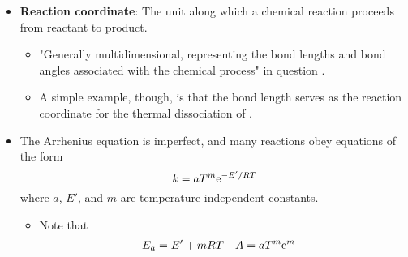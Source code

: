 \documentclass[../notes.tex]{subfiles}
\begin{document}
\begin{itemize}
    \item \textbf{Reaction coordinate}: The unit along which a chemical reaction proceeds from reactant to product.
    \begin{itemize}
        \item "Generally multidimensional, representing the bond lengths and bond angles associated with the chemical process" in question \parencite[1073]{bib:McQuarrieSimon}.
        \item A simple example, though, is that the  bond length serves as the reaction coordinate for the thermal dissociation of .
    \end{itemize}
    \item The Arrhenius equation is imperfect, and many reactions obey equations of the form
    \begin{equation*}
        k = aT^m\e[-E'/RT]
    \end{equation*}
    where $a$, $E'$, and $m$ are temperature-independent constants.
    \begin{itemize}
        \item Note that
        \begin{align*}
            E_a &= E'+mRT&
            A &= aT^m\e[m]
        \end{align*}
    \end{itemize}
\end{itemize}
\end{document}
